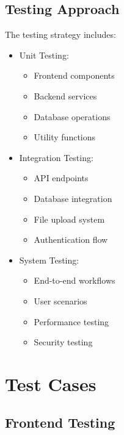 \subsection{Testing Approach}
The testing strategy includes:
\begin{itemize}
    \item Unit Testing:
    \begin{itemize}
        \item Frontend components
        \item Backend services
        \item Database operations
        \item Utility functions
    \end{itemize}
    \item Integration Testing:
    \begin{itemize}
        \item API endpoints
        \item Database integration
        \item File upload system
        \item Authentication flow
    \end{itemize}
    \item System Testing:
    \begin{itemize}
        \item End-to-end workflows
        \item User scenarios
        \item Performance testing
        \item Security testing
    \end{itemize}
\end{itemize}

\section{Test Cases}
\subsection{Frontend Testing}
